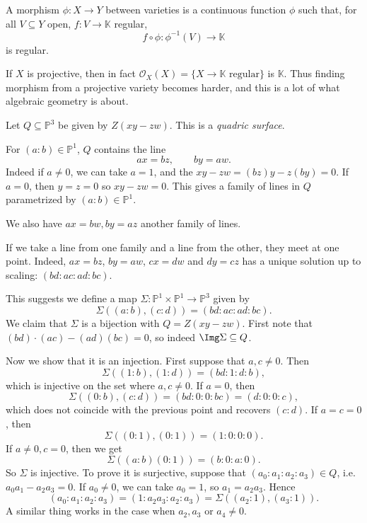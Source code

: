 \documentclass[12pt]{article}
\begin{document}
\begin{definition}
	A morphism $\phi : X \to Y$ between varieties is a continuous function $\phi$ such that, for all $V \subseteq Y$ open, $f : V \to \mathbb{K}$ regular,
	\[
	f \circ \phi : \phi^{-1}(V) \to \mathbb{K}
	\]
	is regular.
\end{definition}

\begin{remark}
	If $X$ is projective, then in fact $\mathcal{O}_X(X) = \{X \to \mathbb{K} \text{ regular}\}$ is $\mathbb{K}$. Thus finding morphism from a projective variety becomes harder, and this is a lot of what algebraic geometry is about.
\end{remark}

\begin{exbox}
	Let $Q \subseteq \mathbb{P}^3$ be given by $Z(xy - zw)$. This is a \emph{quadric surface}.

	For $(a : b) \in \mathbb{P}^1$, $Q$ contains the line
	\[
	ax = bz, \qquad by = aw.
	\]
	Indeed if $a \neq 0$, we can take $a = 1$, and the $xy - zw = (bz)y - z(by) = 0$. If $a = 0$, then $y = z = 0$ so $xy - zw = 0$. This gives a family of lines in $Q$ parametrized by $(a : b) \in \mathbb{P}^1$.

	We also have $ax = bw, by = az$ another family of lines.

	If we take a line from one family and a line from the other, they meet at one point. Indeed, $ax =  bz$, $by = aw$, $cx = dw$ and $dy = cz$ has a unique solution up to scaling: $(bd : ac : ad : bc)$.

	This suggests we define a map $\Sigma : \mathbb{P}^1 \times \mathbb{P}^1 \to \mathbb{P}^3$ given by
	\[
	\Sigma((a:b), (c:d)) = (bd:ac:ad:bc).
	\]
	We claim that $\Sigma$ is a bijection with $Q = Z(xy - zw)$. First note that $(bd) \cdot (ac) - (ad)(bc) = 0$, so indeed $\Img \Sigma \subseteq Q$.

	Now we show that it is an injection. First suppose that $a, c \neq 0$. Then
	\[
	\Sigma((1:b), (1:d)) = (bd : 1 : d : b),
	\]
	which is injective on the set where $a, c \neq 0$. If $a = 0$, then
	\[
	\Sigma((0:b), (c:d)) = (bd : 0 : 0 : bc) = (d : 0 : 0 : c),
	\]
	which does not coincide with the previous point and recovers $(c:d)$. If $a = c = 0$, then
	\[
	\Sigma((0:1),(0:1)) = (1:0:0:0).
	\]
	If $a \neq 0, c = 0$, then we get
	\[
	\Sigma((a:b)(0:1)) = (b:0:a:0).
	\]
	So $\Sigma$ is injective. To prove it is surjective, suppose that $(a_0 : a_1 : a_2 : a_3) \in Q$, i.e. $a_0 a_1 - a_2a_3 = 0$. If $a_0 \neq 0$, we can take $a_0 = 1$, so $a_1 = a_2 a_3$. Hence
	\[
		(a_0 : a_1 : a_2 : a_3) = (1 : a_2 a_3 : a_2 : a_3) = \Sigma((a_2 : 1), (a_3 : 1)).
	\]
	A similar thing works in the case when $a_2, a_3$ or $a_4 \neq 0$.
\end{exbox}
\end{document}
